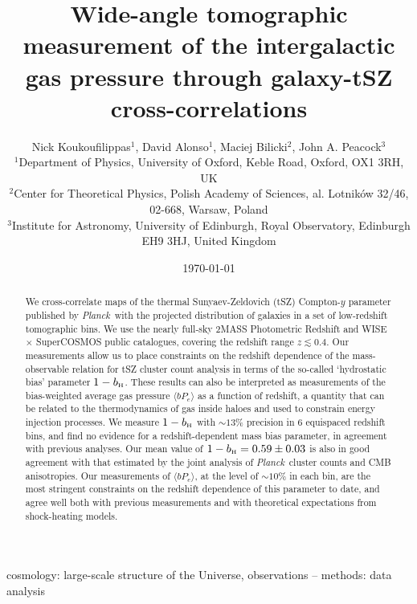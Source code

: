 \documentclass[useAMS,usenatbib]{mn2e}
\title[Tomographic measurement of the intergalactic gas pressure through galaxy-tSZ cross-correlations]{Wide-angle tomographic measurement of the intergalactic gas pressure through galaxy-tSZ cross-correlations}
\author[David Alonso]{Nick Koukoufilippas$^1$, David Alonso$^1$, Maciej Bilicki$^2$, John A. Peacock$^3$\\
                      $^{1}$Department of Physics, University of Oxford, Keble Road, Oxford, OX1 3RH, UK\\
                      $^{2}$Center for Theoretical Physics, Polish Academy of Sciences, al. Lotnik\'ow 32/46, 02-668, Warsaw, Poland\\
                      $^{3}$Institute for Astronomy, University of Edinburgh, Royal Observatory, Edinburgh EH9 3HJ, United Kingdom
                      }
\def\bH{b_{\scriptscriptstyle\rm H}}
\def\planck{{\it Planck\/}}
\begin{document}
  \date{\today}
   
  \maketitle

\begin{abstract}
    We cross-correlate maps of the thermal Sunyaev-Zeldovich (tSZ)
    Compton-$y$ parameter published by \planck\ with the projected
    distribution of galaxies in a set of low-redshift tomographic
    bins. We use the nearly full-sky 2MASS Photometric Redshift and
    WISE $\times$ SuperCOSMOS public
    catalogues, covering the redshift range $z\lesssim0.4$. Our
    measurements allow us to place constraints on the redshift
    dependence of the mass-observable relation for tSZ cluster count
    analysis in terms of the so-called `hydrostatic bias' parameter
    $1-\bH$. These results can also be interpreted as measurements
    of the bias-weighted average gas
    pressure $\langle bP_e\rangle$ as a function of redshift, a
    quantity that can be related to the thermodynamics of gas inside
    haloes and used to constrain energy injection processes. We
    measure $1-\bH$ with $\sim13\%$ precision in 6 equispaced
    redshift bins, and find no evidence for a redshift-dependent mass
    bias parameter, in agreement with previous analyses. Our mean value of
    $1-\bH = 0.59\pm0.03$ is also in good agreement with that estimated by
    the joint analysis of \planck\ cluster counts and CMB
    anisotropies. Our measurements of $\langle bP_e\rangle$, at the
    level of $\sim10\%$ in each bin, are the most stringent
    constraints on the redshift dependence of this parameter to date,
    and agree well both with previous measurements and with
    theoretical expectations from shock-heating
    models.
\end{abstract}

\begin{keywords}
  cosmology: large-scale structure of the Universe, observations -- methods: data analysis
\end{keywords}
\end{document}
